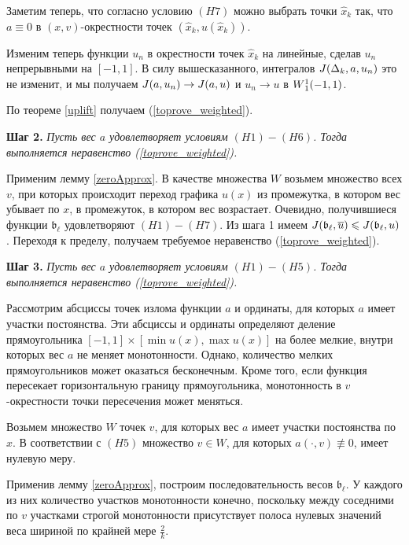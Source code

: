 Заметим теперь, что согласно условию $(H7)$ можно выбрать точки $\hat{x}_k$ так,
что $a \equiv 0$ в $(x, v)$-окрестности точек $(\hat{x}_k, u(\hat{x}_k))$.

Изменим теперь функции $u_n$ в окрестности точек $\hat{x}_k$ на линейные,
сделав $u_n$ непрерывными на $[-1, 1]$.
В силу вышесказанного, интегралов $J(\Delta_k, a, u_n)$ это не изменит,
и мы получаем $J(a, u_n) \to J(a, u)$ и $u_n \to u$ в $W{}_1^1(-1, 1)$.

По теореме \ref{uplift} получаем (\ref{toprove_weighted}).

\bigskip

\textbf{Шаг 2.}
\textit{Пусть вес $a$ удовлетворяет условиям $(H1)-(H6)$.
Тогда выполняется неравенство (\ref{toprove_weighted}).}

Применим лемму \ref{zeroApprox}.
В качестве множества $W$ возьмем множество всех $v$,
при которых происходит переход графика $u(x)$ из промежутка,
в котором вес убывает по $x$, в промежуток, в котором вес возрастает.
Очевидно, получившиеся функции $\mathfrak b_{\ell}$ удовлетворяют $(H1)-(H7)$.
Из шага 1 имеем $\IWg(\mathfrak b_{\ell}, \mon{u}) \le \IWg(\mathfrak b_{\ell}, u)$.
Переходя к пределу, получаем требуемое неравенство (\ref{toprove_weighted}).

\bigskip

\textbf{Шаг 3.}
\textit{Пусть вес $a$ удовлетворяет условиям $(H1)-(H5)$.
Тогда выполняется неравенство (\ref{toprove_weighted}).}

Рассмотрим абсциссы точек излома функции $a$ и ординаты, для которых $a$ имеет участки постоянства.
Эти абсциссы и ординаты определяют деление прямоугольника $[-1, 1] \times [\min u(x), \max u(x)]$
на более мелкие, внутри которых вес $a$ не меняет монотонности.
Однако, количество мелких прямоугольников может оказаться бесконечным.
Кроме того, если функция пересекает горизонтальную границу прямоугольника,
монотонность в $v$-окрестности точки пересечения может меняться.

Возьмем множество $W$ точек $v$, для которых вес $a$ имеет участки постоянства по $x$.
В соответствии с $(H5)$ множество $v \in W$, для которых $a(\cdot, v) \not\equiv 0$, имеет нулевую меру.

Применив лемму \ref{zeroApprox}, построим последовательность весов $\mathfrak b_{\ell}$.
У каждого из них количество участков монотонности конечно,
поскольку между соседними по $v$ участками строгой монотонности
присутствует полоса нулевых значений веса шириной по крайней мере $\frac{2}{k}$.

